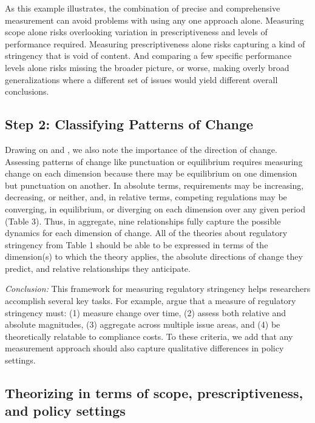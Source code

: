 \documentclass[
      12pt,
            Review ]{article}
\begin{document}
As this example illustrates, the combination of precise and
comprehensive measurement can avoid problems with using any one approach
alone. Measuring scope alone risks overlooking variation in
prescriptiveness and levels of performance required. Measuring
prescriptiveness alone risks capturing a kind of stringency that is void
of content. And comparing a few specific performance levels alone risks
missing the broader picture, or worse, making overly broad
generalizations where a different set of issues would yield different
overall conclusions.

\subsection{Step 2: Classifying Patterns of
Change}\label{step-2-classifying-patterns-of-change}

Drawing on \citet{Baumgartner2002} and \citet{Howlett2007}, we also note
the importance of the direction of change. Assessing patterns of change
like punctuation or equilibrium requires measuring change on each
dimension because there may be equilibrium on one dimension but
punctuation on another. In absolute terms, requirements may be
increasing, decreasing, or neither, and, in relative terms, competing
regulations may be converging, in equilibrium, or diverging on each
dimension over any given period (Table 3). Thus, in aggregate, nine
relationships fully capture the possible dynamics for each dimension of
change. All of the theories about regulatory stringency from Table 1
should be able to be expressed in terms of the dimension(s) to which the
theory applies, the absolute directions of change they predict, and
relative relationships they anticipate.

\emph{Conclusion:} This framework for measuring regulatory stringency
helps researchers accomplish several key tasks. For example,
\citet{Brunel2016} argue that a measure of regulatory stringency must:
(1) measure change over time, (2) assess both relative and absolute
magnitudes, (3) aggregate across multiple issue areas, and (4) be
theoretically relatable to compliance costs. To these criteria, we add
that any measurement approach should also capture qualitative
differences in policy settings.

\subsection{Theorizing in terms of scope, prescriptiveness, and policy
settings}\label{theorizing-in-terms-of-scope-prescriptiveness-and-policy-settings}
\end{document}
